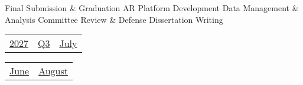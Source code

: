 \vfill{\centering{} \small{Final Submission \& Graduation}\hspace{1.5em} \small{AR Platform Development}\hspace{1.5em} \small{Data Management \& Analysis}\hspace{1.5em} \small{Committee Review \& Defense}\hspace{1.5em} \small{Dissertation Writing}\hspace{1.5em}\par}

\pagebreak
{\noindent\Large\renewcommand{\arraystretch}{\myNumArrayStretch}\begin{tabular}{|l|l|l}
\hyperlink{2027}{2027} & \hyperlink{Q3}{Q3} & \hyperlink{July}{July}
\end{tabular}\hfill%
\begin{tabular}{r|r@{}}
\hyperlink{month-2027-6}{June} & \hyperlink{month-2027-8}{August}
\end{tabular}}
\myLineThick
